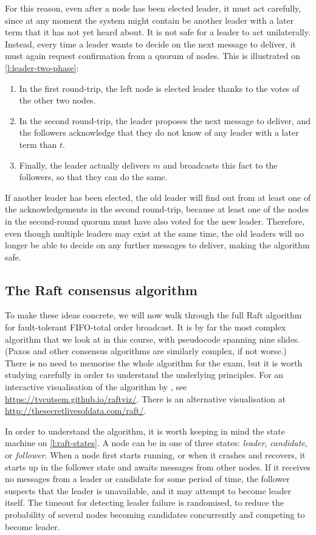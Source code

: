 For this reason, even after a node has been elected leader, it must act carefully, since at any moment the system might contain be another leader with a later term that it has not yet heard about.
It is not safe for a leader to act unilaterally.
Instead, every time a leader wants to decide on the next message to deliver, it must again request confirmation from a quorum of nodes.
This is illustrated on \autoref{l:leader-two-phase}:
\begin{enumerate}
    \item In the first round-trip, the left node is elected leader thanks to the votes of the other two nodes.
    \item In the second round-trip, the leader proposes the next message to deliver, and the followers acknowledge that they do not know of any leader with a later term than $t$.
    \item Finally, the leader actually delivers $m$ and broadcasts this fact to the followers, so that they can do the same.
\end{enumerate}
If another leader has been elected, the old leader will find out from at least one of the acknowledgements in the second round-trip, because at least one of the nodes in the second-round quorum must have also voted for the new leader.
Therefore, even though multiple leaders may exist at the same time, the old leaders will no longer be able to decide on any further messages to deliver, making the algorithm safe.

\subsection{The Raft consensus algorithm}

To make these ideas concrete, we will now walk through the full Raft algorithm for fault-tolerant FIFO-total order broadcast.
It is by far the most complex algorithm that we look at in this course, with pseudocode spanning nine slides.
(Paxos and other consensus algorithms are similarly complex, if not worse.)
There is no need to memorise the whole algorithm for the exam, but it is worth studying carefully in order to understand the underlying principles.
For an interactive visualisation of the algorithm by \citet{VanCutsem:2026}, see \url{https://tvcutsem.github.io/raftviz/}.
There is an alternative visualisation at \url{http://thesecretlivesofdata.com/raft/}.

In order to understand the algorithm, it is worth keeping in mind the state machine on \autoref{l:raft-states}.
A node can be in one of three states: \emph{leader}, \emph{candidate}, or \emph{follower}.
When a node first starts running, or when it crashes and recovers, it starts up in the follower state and awaits messages from other nodes.
If it receives no messages from a leader or candidate for some period of time, the follower suspects that the leader is unavailable, and it may attempt to become leader itself.
The timeout for detecting leader failure is randomised, to reduce the probability of several nodes becoming candidates concurrently and competing to become leader.

